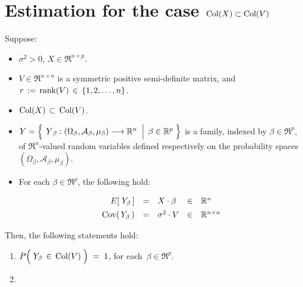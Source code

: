 

\section{Estimation for the case $\textnormal{Col}(X) \subset \textnormal{Col}(V)$}
\setcounter{theorem}{0}
\setcounter{equation}{0}

\renewcommand{\theenumi}{\roman{enumi}}
\renewcommand{\labelenumi}{\textnormal{(\theenumi)}$\;\;$}


\begin{theorem}
\mbox{}
\vskip 0.1cm
\noindent
Suppose:
\begin{itemize}
\item
	$\sigma^{2} > 0$,
	$X \in \Re^{n \times p}$.
\item
	$V \in \Re^{n \times n}$ is a symmetric positive semi-definite matrix, and
	\,$r \,:=\, \textnormal{rank}(V) \,\in\, \{1,2,\ldots,n\}$.
\item
	{\color{red}$\textnormal{Col}(X) \,\subset\, \textnormal{Col}(V)$}.
\item
	$Y = \left\{\;
		\left.
		\overset{{\color{white}.}}{Y}_{\beta} : (\Omega_{\beta},\mathcal{A}_{\beta},\mu_{\beta}) \longrightarrow \Re^{n}
		\;\;\right\vert\;
		\beta \in \Re^{p}
		\;\right\}$
	is a family, indexed by $\beta \in \Re^{p}$,
	of $\Re^{n}$-valued random variables defined respectively on the
	probability spaces $(\Omega_{\beta},\mathcal{A}_{\beta},\mu_{\beta})$.
\item
	For each $\beta \in \Re^{p}$, the following hold:
	\begin{equation*}
	\begin{array}{rclcl}
	E\!\left[\;Y_{\beta}\,\right] &  \overset{{\color{white}\vert}}{=} & X \cdot \beta & \in & \Re^{n}
	\\
	\Cov\!\left(\,Y_{\beta}\,\right) & \overset{{\color{white}\vert}}{=} & \sigma^{2} \cdot V & \in & \Re^{n \times n}
	\end{array}
	\end{equation*}
\end{itemize}
Then, the following statements hold:
\begin{enumerate}
\item\label{PYinColVEqOne}
	$P\!\left(\;Y_{\beta} \,\overset{{\color{white}.}}{\in}\, \Col(V)\;\right) \; = \; 1$,\;
	for each \,$\beta \in \Re^{p}$.
\item\label{XtVdaggerX}

\end{enumerate}
\end{theorem}
